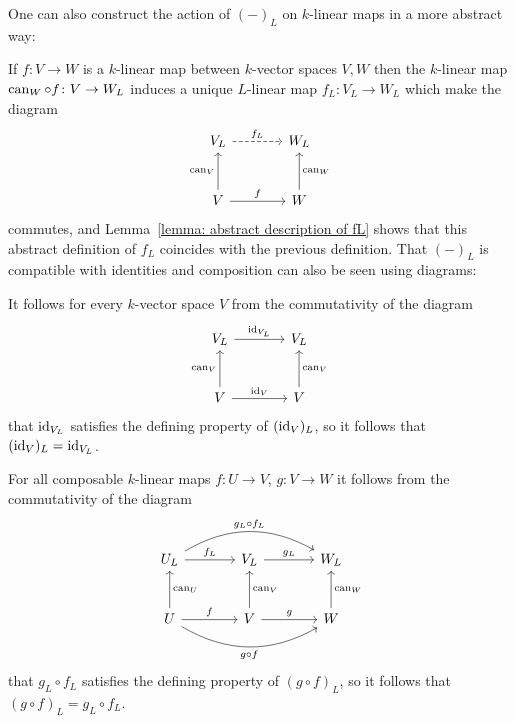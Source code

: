 \begin{remark}
  One can also construct the action of $(-)_L$ on $k$-linear maps in a more abstract way:
  
  If $f \colon V \to W$ is a $k$-linear map between $k$-vector spaces $V, W$ then the $k$-linear map $\operatorname{can}_W \circ f \colon V \to W_L$ induces a unique $L$-linear map $f_L \colon V_L \to W_L$ which make the diagram
  \[
    \begin{tikzcd}[sep = large]
        V_L
        \arrow[dashed]{r}[above]{f_L}
      & W_L
      \\
        V
        \arrow{r}[above]{f}
        \arrow{u}[left]{\can_V}
      & W
        \arrow{u}[right]{\can_W}
    \end{tikzcd}
  \]
  commutes, and Lemma~\ref{lemma: abstract description of fL} shows that this abstract definition of $f_L$ coincides with the previous definition.
  That $(-)_L$ is compatible with identities and composition can also be seen using diagrams:
  
  It follows for every $k$-vector space $V$ from the commutativity of the diagram
  \[
    \begin{tikzcd}[sep = large]
        V_L
        \arrow{r}[above]{\id_{V_L}}
      & V_L
      \\
        V
        \arrow{r}[above]{\id_V}
        \arrow{u}[left]{\can_V}
      & V
        \arrow{u}[right]{\can_V}
    \end{tikzcd}
  \]
  that $\operatorname{id}_{V_L}$ satisfies the defining property of $(\operatorname{id}_V)_L$, so it follows that $(\operatorname{id}_V)_L = \operatorname{id}_{V_L}$.
  
  For all composable $k$-linear maps $f \colon U \to V$, $g \colon V \to W$ it follows from the commutativity of the diagram
  \[
    \begin{tikzcd}[sep = large]
        U_L
        \arrow{r}[above]{f_L}
        \arrow[bend left]{rr}[above]{g_L \circ f_L}
      & V_L
        \arrow{r}[above]{g_L}
      & W_L
      \\
        U
        \arrow{u}[right]{\can_U}
        \arrow{r}[above]{f}
        \arrow[bend right]{rr}[below]{g \circ f}
      & V
        \arrow{u}[right]{\can_V}
        \arrow{r}[above]{g}
      & W
        \arrow{u}[right]{\can_W}
    \end{tikzcd}
  \]
  that $g_L \circ f_L$ satisfies the defining property of $(g \circ f)_L$, so it follows that $(g \circ f)_L= g_L \circ f_L$.
\end{remark}


